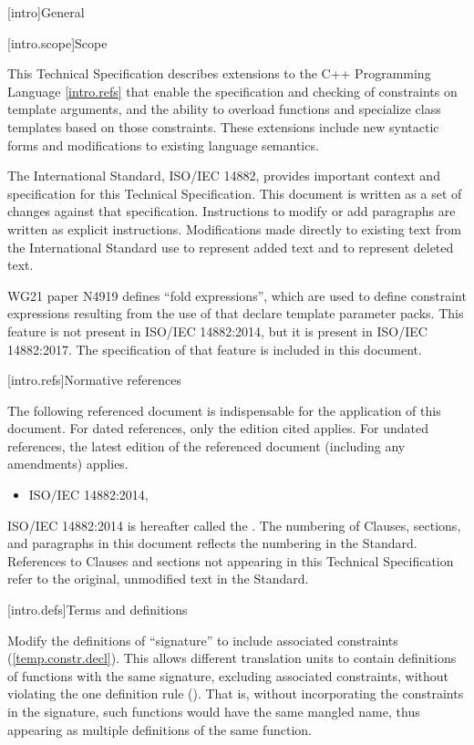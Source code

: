 
[intro]{General}

[intro.scope]{Scope}

\pnum
This Technical Specification describes extensions to the C++ 
Programming Language \ref{intro.refs} that
enable the specification and checking of constraints on template 
arguments, and the ability to overload functions and specialize
class templates based on those constraints. These extensions include 
new syntactic forms and modifications to existing language semantics.

\pnum
The International Standard, ISO/IEC 14882, provides important context
and specification for this Technical Specification. This document is 
written as a set of changes against that specification. Instructions
to modify or add paragraphs are written as explicit instructions. 
Modifications made directly to existing text from the International
Standard use  to represent added text and
 to represent deleted text.

\pnum
WG21 paper N4919 defines ``fold expressions'', which are used to define 
constraint expressions resulting from the use of 
 that declare template parameter
packs. This feature is not present in ISO/IEC 14882:2014, but it is
present in ISO/IEC 14882:2017. The specification of that feature is
included in this document.


[intro.refs]{Normative references}

\pnum
The following referenced document is indispensable for the
application of this document. For dated references, only the
edition cited applies. For undated references, the latest edition
of the referenced document (including any amendments) applies.

\begin{itemize}
\item ISO/IEC 14882:2014, 
\end{itemize}

ISO/IEC 14882:2014 is hereafter called the .
%
The numbering of Clauses, sections, and paragraphs in this document
reflects the numbering in the \Cpp Standard. References to Clauses
and sections not appearing in this Technical Specification refer to
the original, unmodified text in the \Cpp Standard.

[intro.defs]{Terms and definitions}

Modify the definitions of ``signature'' to include associated
constraints (\ref{temp.constr.decl}). This allows different translation units
to contain definitions of functions with the same signature, excluding 
associated constraints, without violating the one definition rule 
(). That is, without incorporating the constraints
in the signature, such functions would have the same mangled name, thus
appearing as multiple definitions of the same function.

